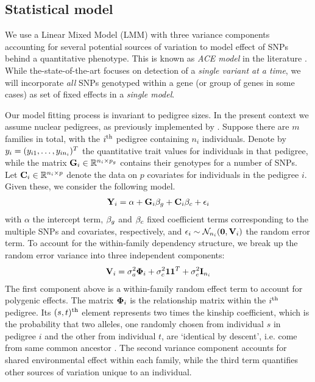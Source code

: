 \subsection{Statistical model}
We use a Linear Mixed Model (LMM) with three variance components accounting for several potential sources of variation to model effect of SNPs behind a quantitative phenotype. This is known as \textit{ACE model} in the literature \citep{KohlerEtal11}. While the-state-of-the-art focuses on detection of a {\it single variant at a time}, we will incorporate \textit{all} SNPs genotyped within a gene (or group of genes in some cases) as set of fixed effects in a \textit{single model}.

Our model fitting process is invariant to pedigree sizes. In the present context we assume nuclear pedigrees, as previously implemented by \cite{ChenAbecasis07,LiEtal11,McGueEtal13}. Suppose there are $m$ families in total, with the $i^{\operatorname*{th}}$ pedigree containing $n_i$ individuals. Denote by ${y}_i = (y_{i 1}, \ldots, y_{i n_i})^T $ the quantitative trait values for individuals in that pedigree, while the matrix ${\mathbf{G}}_i \in \mathbb{R}^{ n_i \times p_g}$ contains their genotypes for a number of SNPs. Let ${\mathbf{C}}_i \in \mathbb{R}^{ n_i \times p}$ denote the data on $p$ covariates for individuals in the pedigree $i$. Given these, we consider the following model.
%
\begin{align}\label{eqn:LMMeqn}
\bfY_i = \alpha + \bfG_i \bfbeta_g + \bfC_i \bfbeta_c + \bfepsilon_i
\end{align}
%
with $\alpha$ the intercept term, ${\beta}_g$ and ${\beta}_c$ fixed coefficient terms corresponding to the multiple SNPs and covariates, respectively, and ${\epsilon}_i \sim \mathcal{N}_{n_i} ({\bf 0}, {\mathbf{V}}_i)$ the random error term. To account for the within-family dependency structure, we break up the random error variance into three independent components:
%
\begin{align}\label{eqn:partsOfV}
\bfV_i = \sigma_a^2 \bfPhi_i + \sigma_c^2 {\bf 1} {\bf 1}^T + \sigma_e^2 \bfI_{n_i}
\end{align}
%
The first component above is a within-family random effect term to account for polygenic effects. The matrix ${\boldsymbol{\Phi}}_i$ is the relationship matrix within the $i^{\operatorname*{th}}$ pedigree. Its $(s,t)^{\operatorname*{th}}$ element represents two times the kinship coefficient, which is the probability that two alleles, one randomly chosen from individual $s$ in pedigree $i$ and the other from individual $t$, are `identical by descent', i.e. come from same common ancestor \citep{KohlerEtal11}. The second variance component accounts for shared environmental effect within each family, while the third term quantifies other sources of variation unique to an individual.

